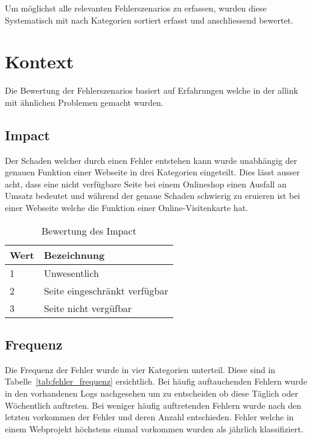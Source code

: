 
Um möglichst alle relevanten Fehlerszenarios zu erfassen, wurden diese Systematisch mit nach Kategorien sortiert erfasst und anschliessend bewertet.

\section{Kontext}
\label{sec:kontext}
Die Bewertung der Fehlerszenarios basiert auf Erfahrungen welche in der allink mit ähnlichen Problemen gemacht wurden.

\makeatletter
{} \setcounter{fnumber}{0}
\renewcommand\thefnumber{F\arabic{fnumber}}
\newcommand{\newfnumber}[5]%
{%
\midrule%
\refstepcounter{fnumber}%
\expandafter\xdef\csname f#2\endcsname {#1}%
\thefnumber\label{f:#2} & #1 & #3 & #4 & #5 \\
}
\makeatother

\subsection{Impact}
\label{sub:impact}
Der Schaden welcher durch einen Fehler entstehen kann wurde unabhängig der genauen Funktion einer Webseite in drei Kategorien eingeteilt. Dies lässt ausser acht, dass eine nicht verfügbare Seite bei einem Onlineshop einen Ausfall an Umsatz bedeutet und während der genaue Schaden schwierig zu eruieren ist bei einer Webseite welche die Funktion einer Online-Visitenkarte hat.


\begin{table}[h!]
  \centering
  \begin{tabular}{ll}
  \toprule
    Wert & Bezeichnung\\
  \hline
    1 & Unwesentlich\\
  \hline
    2 & Seite eingeschränkt verfügbar\\
  \hline
    3 & Seite nicht vergüfbar\\
  \bottomrule
  \end{tabular}
  \caption{Bewertung des Impact}
  \label{tab:impact}
\end{table}

\subsection{Frequenz}
\label{sub:frequenz}
Die Frequenz der Fehler wurde in vier Kategorien unterteil. Diese sind in Tabelle~\ref{tab:fehler_frequenz} ersichtlich. Bei häufig auftauchenden Fehlern wurde in den vorhandenen Logs nachgesehen um zu entscheiden ob diese Täglich oder Wöchentlich auftreten. Bei weniger häufig auftretenden Fehlern wurde nach den letzten vorkommen der Fehler und deren Anzahl entschieden. Fehler welche in einem Webprojekt höchstens einmal vorkommen wurden als jährlich klassifiziert.


